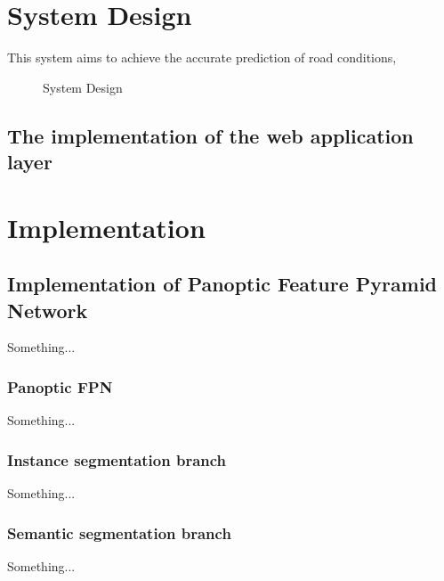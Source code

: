 \documentclass[10pt, conference, compsocconf]{IEEEtran}
\begin{document}
	
	\section{System Design}
	This system aims to achieve the accurate prediction of road conditions, 
	
	\begin{figure}[!h]
		\centering
		\caption{System Design}
	\end{figure}
	
	\subsection{The implementation of the web application layer}
	
	
	\section{Implementation}
	\subsection{Implementation of Panoptic Feature Pyramid Network}
	
	Something...
	
	\subsubsection{Panoptic FPN}
	
	Something...
	
	\subsubsection{Instance segmentation branch}
	
	Something...
	
	\subsubsection{Semantic segmentation branch}

	Something...
	
\end{document}
